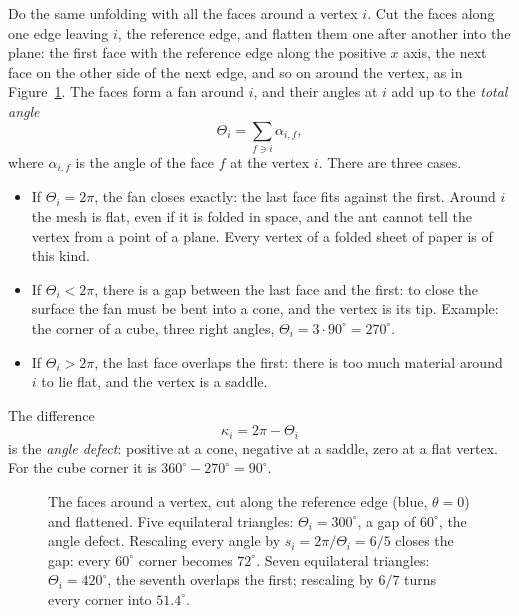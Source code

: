 Do the same unfolding with all the faces around a vertex $i$. Cut the faces along one edge leaving $i$, the reference edge, and flatten them one after another into the plane: the first face with the reference edge along the positive $x$ axis, the next face on the other side of the next edge, and so on around the vertex, as in Figure~\ref{fig:cone_rescale}. The faces form a fan around $i$, and their angles at $i$ add up to the \emph{total angle}
\begin{equation}
\label{eqn:total_angle}
\Theta_i = \sum_{f \ni i} \alpha_{i,f} ,
\end{equation}
where $\alpha_{i,f}$ is the angle of the face $f$ at the vertex $i$. There are three cases.
\begin{itemize}
\item If $\Theta_i = 2\pi$, the fan closes exactly: the last face fits against the first. Around $i$ the mesh is flat, even if it is folded in space, and the ant cannot tell the vertex from a point of a plane. Every vertex of a folded sheet of paper is of this kind.
\item If $\Theta_i < 2\pi$, there is a gap between the last face and the first: to close the surface the fan must be bent into a cone, and the vertex is its tip. Example: the corner of a cube, three right angles, $\Theta_i = 3 \cdot 90^\circ = 270^\circ$.
\item If $\Theta_i > 2\pi$, the last face overlaps the first: there is too much material around $i$ to lie flat, and the vertex is a saddle.
\end{itemize}
The difference
\begin{equation}
\label{eqn:defect}
\kappa_i = 2\pi - \Theta_i
\end{equation}
is the \emph{angle defect}: positive at a cone, negative at a saddle, zero at a flat vertex. For the cube corner it is $360^\circ - 270^\circ = 90^\circ$.
\begin{figure}[t]
\centering
{}
\caption{The faces around a vertex, cut along the reference edge (blue, $\theta = 0$) and flattened. Five equilateral triangles: $\Theta_i = 300^\circ$, a gap of $60^\circ$, the angle defect. Rescaling every angle by $s_i = 2\pi/\Theta_i = 6/5$ closes the gap: every $60^\circ$ corner becomes $72^\circ$. Seven equilateral triangles: $\Theta_i = 420^\circ$, the seventh overlaps the first; rescaling by $6/7$ turns every corner into $51.4^\circ$.}
\label{fig:cone_rescale}
\end{figure}

